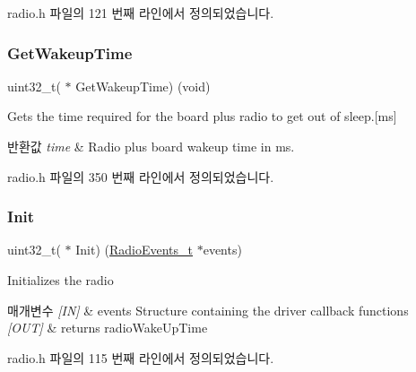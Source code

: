radio.\+h 파일의 121 번째 라인에서 정의되었습니다.

\mbox{\label{struct_radio__s_aa6c05429af1a9f479d4720d95d0ee774}} 
\subsubsection{\texorpdfstring{Get\+Wakeup\+Time}{GetWakeupTime}}
{\footnotesize\ttfamily uint32\+\_\+t( $\ast$ Get\+Wakeup\+Time) (void)}



Gets the time required for the board plus radio to get out of sleep.\mbox{[}ms\mbox{]} 


\begin{DoxyRetVals}{반환값}
{\em time} & Radio plus board wakeup time in ms. \\
\hline
\end{DoxyRetVals}


radio.\+h 파일의 350 번째 라인에서 정의되었습니다.

\mbox{\label{struct_radio__s_a976a50280beda4c9dd58b8354affb6b4}} 
\subsubsection{\texorpdfstring{Init}{Init}}
{\footnotesize\ttfamily uint32\+\_\+t( $\ast$ Init) (\mbox{\hyperlink{struct_radio_events__t}{Radio\+Events\+\_\+t}} $\ast$events)}



Initializes the radio 


\begin{DoxyParams}{매개변수}
{\em \mbox{[}\+I\+N\mbox{]}} & events Structure containing the driver callback functions \\
\hline
{\em \mbox{[}\+O\+U\+T\mbox{]}} & returns radio\+Wake\+Up\+Time \\
\hline
\end{DoxyParams}


radio.\+h 파일의 115 번째 라인에서 정의되었습니다.

\mbox{\label{struct_radio__s_ad96e15c082765bd1e893b4a5e6c39f8c}} 
